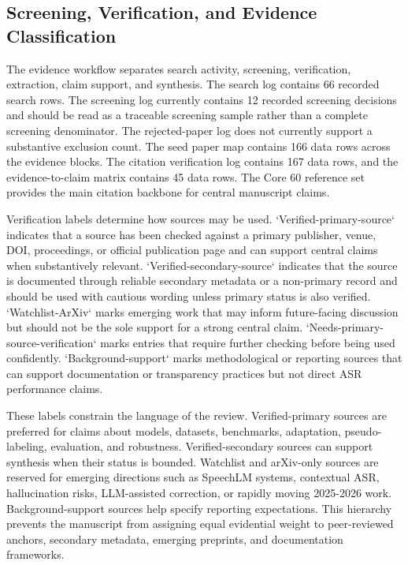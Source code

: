 \documentclass[pdflatex,sn-basic,iicol]{sn-jnl}
\theoremstyle{thmstyleone}
\theoremstyle{thmstyletwo}
\theoremstyle{thmstylethree}
\begin{document}
\subsection{Screening, Verification, and Evidence Classification}

The evidence workflow separates search activity, screening, verification, extraction, claim support, and synthesis. The search log contains 66 recorded search rows. The screening log currently contains 12 recorded screening decisions and should be read as a traceable screening sample rather than a complete screening denominator. The rejected-paper log does not currently support a substantive exclusion count. The seed paper map contains 166 data rows across the evidence blocks. The citation verification log contains 167 data rows, and the evidence-to-claim matrix contains 45 data rows. The Core 60 reference set provides the main citation backbone for central manuscript claims.

Verification labels determine how sources may be used. `Verified-primary-source` indicates that a source has been checked against a primary publisher, venue, DOI, proceedings, or official publication page and can support central claims when substantively relevant. `Verified-secondary-source` indicates that the source is documented through reliable secondary metadata or a non-primary record and should be used with cautious wording unless primary status is also verified. `Watchlist-ArXiv` marks emerging work that may inform future-facing discussion but should not be the sole support for a strong central claim. `Needs-primary-source-verification` marks entries that require further checking before being used confidently. `Background-support` marks methodological or reporting sources that can support documentation or transparency practices but not direct ASR performance claims.

These labels constrain the language of the review. Verified-primary sources are preferred for claims about models, datasets, benchmarks, adaptation, pseudo-labeling, evaluation, and robustness. Verified-secondary sources can support synthesis when their status is bounded. Watchlist and arXiv-only sources are reserved for emerging directions such as SpeechLM systems, contextual ASR, hallucination risks, LLM-assisted correction, or rapidly moving 2025-2026 work. Background-support sources help specify reporting expectations. This hierarchy prevents the manuscript from assigning equal evidential weight to peer-reviewed anchors, secondary metadata, emerging preprints, and documentation frameworks.
\end{document}
